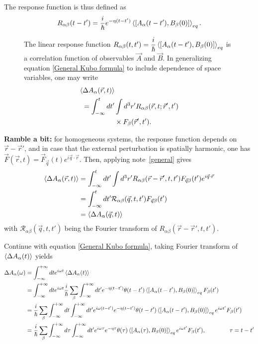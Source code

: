 \documentclass[a4paper,12pts,dvipsnames]{article}
\numberwithin{equation}{section}
\newcounter{mynote}
\newcommand\StoryNote[3][]{%
	\begin{figure}
		\begin{mynote}[label=#3]
			#2
		\end{mynote}%
	\end{figure}%
}
\begin{document}
The response function is thus defined as
\begin{equation}
	R_{\alpha\beta}(t-t') = \frac{i}{\hbar} e^{-\eta(t-t')}\braket{[A_{\alpha}(t-t'),B_{\beta}(0)]}_{eq}.
\end{equation}
\begin{story}
	\StoryNote{The linear response function $R_{\alpha\beta}(t,t') = \dfrac{i}{\hbar}\braket{\left[A_{\alpha}(t-t'),B_{\beta}(0)\right]}_{eq}$ is a correlation function of observables $\vec{A}$ and $\vec{B}$. In generalizing equation \ref{General Kubo formula} to include dependence of space variables, one may write
		\begin{align}
			\braket{\Delta A_{\alpha}(\vec{r},t)}&\nonumber \\
			= \int^t_{-\infty}dt'&\int d^3r'R_{\alpha\beta}(\vec{r},t;\vec{r}',t')\nonumber \\
			&\times F_{\beta}(\vec{r}',t').\nonumber
		\end{align}
	}{general}
	\textbf{Ramble a bit:} for homogeneous systems, the response function depends on $\vec{r}-\vec{r}'$, and in case that the external perturbation is spatially harmonic, one has $\vec{F}(\vec{r},t) = \vec{F}_{\vec{q}}(t)e^{i\vec{q}\cdot\vec{r}}$. Then, applying note~\ref{general} gives
	\begin{align}
		\braket{\Delta A_{\alpha}(\vec{r},t)} &= \int^t_{-\infty}dt'\int d^3r'R_{\alpha\beta}(\vec{r}-\vec{r}',t,t')F_{\vec{q}\beta}(t')e^{i\vec{q}\cdot\vec{r}}\\
		&= \int^t_{-\infty}dt'\mathcal{R}_{\alpha\beta}(\vec{q},t,t')F_{\vec{q}\beta}(t') \\
		&= \braket{\Delta A_{\alpha}(\vec{q},t)}
	\end{align}
	with $\mathcal{R}_{\alpha\beta}(\vec{q},t,t')$ being the Fourier transform of $R_{\alpha\beta}(\vec{r}-\vec{r}',t,t')$.
\end{story}
\noindent Continue with equation \ref{General Kubo formula}, taking Fourier transform of $\braket{\Delta A_{\alpha}(t)}$ yields
\begin{align}
	\Delta A_{\alpha}(\omega) &= \int^{+\infty}_{-\infty}dte^{i\omega t}\braket{\Delta A_{\alpha}(t)}\nonumber \\ &= \int^{+\infty}_{-\infty}dte^{i\omega t}\frac{i}{\hbar}\sum_{\beta}\int^{+\infty}_{-\infty}dt' e^{-\eta(t-t')}\theta(t-t')\braket{[A_{\alpha}(t-t'),B_{\beta}(0)]}_{eq} F_{\beta}(t')\\
	&= \frac{i}{\hbar}\sum_{\beta}\int^{+\infty}_{-\infty}dt\int^{+\infty}_{-\infty}dt' e^{i\omega(t-t')}e^{-\eta(t-t')}\theta(t-t')\braket{[A_{\alpha}(t-t'),B_{\beta}(0)]}_{eq} e^{i\omega t'}F_{\beta}(t')\\
	&= \frac{i}{\hbar}\sum_{\beta}\int^{+\infty}_{-\infty}d\tau\int^{+\infty}_{-\infty}dt' e^{i\omega\tau}e^{-\eta\tau}\theta(\tau)\braket{[A_{\alpha}(\tau),B_{\beta}(0)]}_{eq} e^{i\omega t'}F_{\beta}(t'), \qquad\qquad \tau = t-t'
\end{align}
\end{document}
